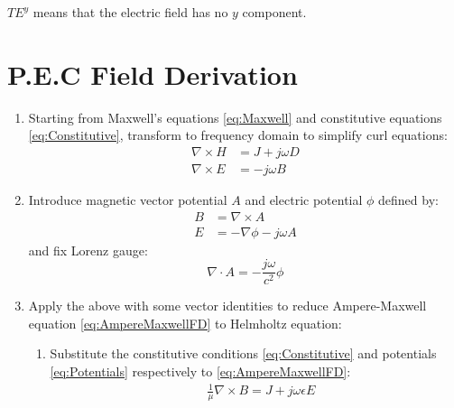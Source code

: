 \documentclass{article}
\begin{document}
$TE^y$ means that the electric field has no $y$ component.
\newpage
\section{P.E.C Field Derivation}
    \begin{enumerate}
        \item   Starting from Maxwell's equations \eqref{eq:Maxwell} and constitutive equations \eqref{eq:Constitutive}, transform to frequency domain to simplify curl equations:
                \begin{subequations}\label{eq:MaxwellFD}
                    \begin{align}
                        \nabla \times H &= J + j \omega D \label{eq:AmpereMaxwellFD} \\
                        \nabla \times E &= - j \omega B \label{eq:MaxwellFaradayFD}
                    \end{align}
                \end{subequations}
        \item   Introduce magnetic vector potential $A$ and electric potential $\phi$ defined by:
                \begin{subequations}\label{eq:Potentials}
                    \begin{align}
                        B &= \nabla \times A \label{eq:MagneticPotential} \\
                        E &= - \nabla \phi - j \omega A \label{eq:ElectricPotential}
                    \end{align}
                \end{subequations}
                and fix Lorenz gauge:
                \begin{equation} \label{eq:LorenzGaugeCondition}
                    \nabla \cdot A = - \frac{j \omega}{c^2} \phi
                \end{equation}
        \item   Apply the above with some vector identities to reduce Ampere-Maxwell equation \eqref{eq:AmpereMaxwellFD} to Helmholtz equation:
                \begin{enumerate}
                    \item Substitute the constitutive conditions \eqref{eq:Constitutive} and potentials \eqref{eq:Potentials} respectively to \eqref{eq:AmpereMaxwellFD}:
                        \begin{align*}
                            & \frac{1}{\mu} \nabla \times B = J + j \omega \epsilon E \\

\end{align*}
\end{enumerate}
\end{enumerate}
\end{document}
